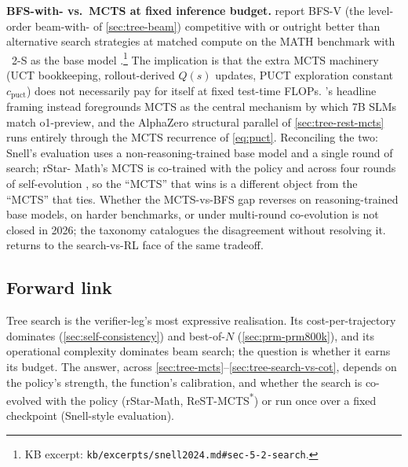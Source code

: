 \begin{contradiction}
\textbf{BFS-with- vs.\ MCTS at fixed inference budget.}
\citet[\S 5--6]{snell2024} report BFS-V (the level-order
beam-with- of \cref{sec:tree-beam}) competitive with or outright
better than alternative search strategies at matched compute on the
MATH benchmark with ~2-S\* as the base model
\citep[\S 5.2]{snell2024}.\footnote{KB excerpt:
\texttt{kb/excerpts/snell2024.md\#sec-5-2-search}.} The implication
is that the extra MCTS machinery (UCT bookkeeping, rollout-derived
$Q(s)$ updates, PUCT exploration constant $c_\text{puct}$) does not
necessarily pay for itself at fixed test-time FLOPs. \citet{rstar-math2025}'s
headline framing instead foregrounds MCTS as the central mechanism by
which 7B SLMs match o1-preview, and the AlphaZero structural parallel
of \cref{sec:tree-rest-mcts} runs entirely through the MCTS recurrence
of \cref{eq:puct}. Reconciling the two: Snell's evaluation uses a
non-reasoning-trained base model and a single round of search; rStar-
Math's MCTS is co-trained with the policy and  across four rounds
of self-evolution \citep[abstract]{rstar-math2025}, so the
``MCTS'' that wins is a different object from the
``MCTS'' that ties. Whether the MCTS-vs-BFS gap reverses on
reasoning-trained base models, on harder benchmarks, or under
multi-round co-evolution is not closed in 2026; the
\citet{wei2025-tree-search-survey} taxonomy
catalogues the disagreement without resolving
it.  returns to the
search-vs-RL face of the same tradeoff.
\end{contradiction}

\subsection{Forward link}
\label{sec:tree-forward}

Tree search is the verifier-leg's most expressive realisation. Its
cost-per-trajectory dominates 
(\cref{sec:self-consistency}) and best-of-$N$
(\cref{sec:prm-prm800k}), and its operational complexity dominates
beam search; the question is whether it earns its budget. The answer,
across \cref{sec:tree-mcts}--\cref{sec:tree-search-vs-cot}, depends
on the policy's strength, the  function's calibration, and
whether the search is co-evolved with the policy
(rStar-Math, ReST-MCTS\textsuperscript{*}) or run once over a fixed
checkpoint (Snell-style evaluation).

